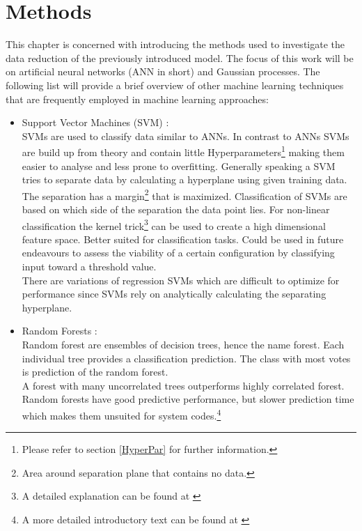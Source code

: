 \chapter{Methods}
	\label{Chap:Methods}
	This chapter is concerned with introducing the methods used to investigate the data reduction of the previously introduced model. The focus of this work will be on artificial neural networks (ANN in short) and Gaussian processes.
	The following list will provide a brief overview of other machine learning techniques that are frequently employed in machine learning approaches:
	\begin{itemize}
		\item Support Vector Machines (SVM) \cite{SVMBook}:\\
			SVMs are used to classify data similar to ANNs. In contrast to ANNs SVMs are build up from theory and contain little Hyperparameters\footnote{Please refer to section \ref{HyperPar} for further information.} making them easier to analyse and less prone to overfitting. Generally speaking a SVM tries to separate data by calculating a hyperplane using given training data. The separation has a margin\footnote{Area around separation plane that contains no data.} that is maximized. Classification of SVMs are based on which side of the separation the data point lies. For non-linear classification the kernel trick\footnote{A detailed explanation can be found at \cite{KernelTrick}} can be used to create a high dimensional feature space.
			Better suited for classification tasks. Could be used in future endeavours to assess the viability of a certain configuration by classifying input toward a threshold value.\\%
			There are variations of regression SVMs which are difficult to optimize for performance since SVMs rely on analytically calculating the separating hyperplane.\\
		\item Random Forests :\\
			Random forest are ensembles of decision trees, hence the name forest. Each individual tree provides a classification prediction. The class with most votes is prediction of the random forest.\\
			A forest with many uncorrelated trees outperforms highly correlated forest. Random forests have good predictive performance, but slower prediction time which makes them unsuited for system codes.\footnote{A more detailed introductory text can be found at \cite{RandForest}}

\end{itemize}
